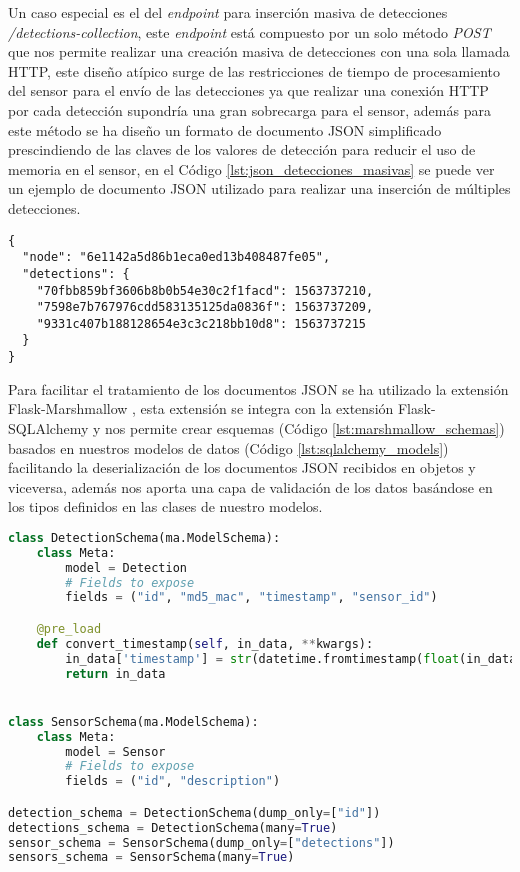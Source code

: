 \documentclass[../proyecto.tex]{subfiles}
\begin{document}
Un caso especial es el del \textit{endpoint} para inserción masiva de detecciones \textit{/detections-collection}, este \textit{endpoint} está compuesto por un solo método \textit{POST} que nos permite realizar una creación masiva de detecciones con una sola llamada HTTP, este diseño atípico surge de las restricciones de tiempo de procesamiento del sensor para el envío de las detecciones ya que realizar una conexión HTTP por cada detección supondría una gran sobrecarga para el sensor, además para este método se ha diseño un formato de documento JSON simplificado prescindiendo de las claves de los valores de detección para reducir el uso de memoria en el sensor, en el Código \ref{lst:json_detecciones_masivas} se puede ver un ejemplo de documento JSON utilizado para realizar una inserción de múltiples detecciones.\\

\begin{minipage}{\linewidth}
\begin{lstlisting}[caption=Ejemplo de JSON para inserción masiva de detecciones, label={lst:json_detecciones_masivas},captionpos=b, frame=single]
{
  "node": "6e1142a5d86b1eca0ed13b408487fe05",
  "detections": {
    "70fbb859bf3606b8b0b54e30c2f1facd": 1563737210,
    "7598e7b767976cdd583135125da0836f": 1563737209,
    "9331c407b188128654e3c3c218bb10d8": 1563737215
  }
}
\end{lstlisting}
\end{minipage}

Para facilitar el tratamiento de los documentos JSON se ha utilizado la extensión Flask-Marshmallow \cite{flask_marshmallow}, esta extensión se integra con la extensión Flask-SQLAlchemy y nos permite crear esquemas (Código \ref{lst:marshmallow_schemas}) basados en nuestros modelos de datos  (Código \ref{lst:sqlalchemy_models}) facilitando la deserialización de los documentos JSON recibidos en objetos y viceversa, además nos aporta una capa de validación de los datos basándose en los tipos definidos en las clases de nuestro modelos.\\

\begin{minipage}{\linewidth}
\begin{lstlisting}[language=Python, caption=Esquemas de datos de Flask-Marshmallow, label={lst:marshmallow_schemas},captionpos=b, frame=single]
class DetectionSchema(ma.ModelSchema):
    class Meta:
        model = Detection
        # Fields to expose
        fields = ("id", "md5_mac", "timestamp", "sensor_id")

    @pre_load
    def convert_timestamp(self, in_data, **kwargs):
        in_data['timestamp'] = str(datetime.fromtimestamp(float(in_data['timestamp'])))
        return in_data


class SensorSchema(ma.ModelSchema):
    class Meta:
        model = Sensor
        # Fields to expose
        fields = ("id", "description")

detection_schema = DetectionSchema(dump_only=["id"])
detections_schema = DetectionSchema(many=True)
sensor_schema = SensorSchema(dump_only=["detections"])
sensors_schema = SensorSchema(many=True)
\end{lstlisting}
\end{minipage}
\end{document}
